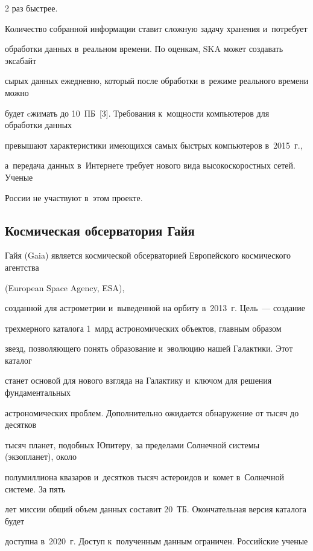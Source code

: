 \begin{multicols}{2}
 раз быстрее. 


  


  Количество собранной информации ставит сложную задачу хранения и~потребует 


обработки данных в~реальном времени. По оценкам, SKA может создавать эксабайт  


сырых данных ежедневно, который после обработки в~режиме реального времени можно 


будет cжимать до 10~ПБ~[3]. Требования к~мощности компьютеров для обработки данных 


превышают характеристики имеющихся самых быстрых компьютеров в~2015~г., 


а~передача данных в~Интернете требует нового вида высокоскоростных сетей. Ученые 


России не участвуют в~этом проекте.





\subsection{Космическая обсерватория Гайя}





  Гайя  (Gaia) является космической обсерваторией Европейского космического агентства 


  (European Space Agency, ESA), 


созданной для астрометрии и~выведенной на орбиту в~2013~г. Цель~--- создание 


трехмерного каталога 1~млрд астрономических объектов, главным образом 


звезд, позволяющего понять образование и~эволюцию нашей Галактики. Этот каталог 


станет основой для нового взгляда на Галактику и~ключом для решения фундаментальных 


астрономических проблем. Дополнительно ожидается обнаружение от тысяч до десятков 


тысяч планет, подобных Юпитеру, за пределами Солнечной сис\-те\-мы (экзопланет), около 


полумиллиона квазаров и~десятков тысяч астероидов и~комет в~Солнечной сис\-те\-ме. За пять 


лет миссии общий объем данных составит 20~ТБ. Окончательная версия каталога будет 


доступна в~2020~г. Доступ к~полученным данным ограничен. Российские ученые 



\end{multicols}
